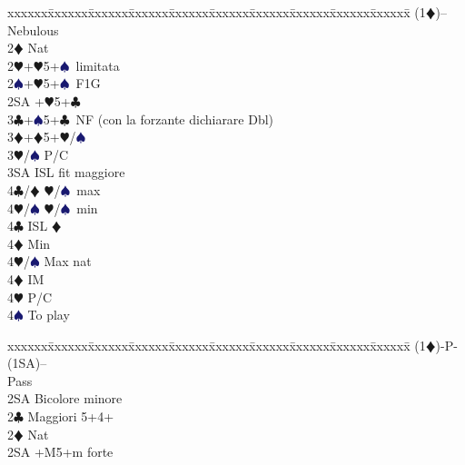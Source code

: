 \documentclass[a4paper,italian]{article}
\newcommand{\BC}{\textcolor{OliveGreen}{$\clubsuit$}}
\newcommand{\BD}{\textcolor{RedOrange}{$\vardiamondsuit$}}
\newcommand{\BH}{\textcolor{Red2}{$\varheartsuit${}}}
\newcommand{\BS}{\textcolor{MidnightBlue}{$\spadesuit${}}}
\newenvironment{bidtable}
{\begin{tabbing}

    xxxxxx\=xxxxxx\=xxxxxx\=xxxxxx\=xxxxxx\=xxxxxx\=xxxxxx\=xxxxxx\=xxxxxx\=xxxxxx\=\kill}
{\end{tabbing} }%
\begin{document}
\begin{multicols}{2}
                                        \begin{bidtable}
                                            (1\BD)-- \> Nebulous\+\\
                                            2\BD \> Nat\\
                                            2\BH {}+\BH 5+\BS\ limitata\\
                                            2\BS {}+\BH 5+\BS\ F1G\\
                                            2SA +\BH 5+\BC \\
                                            3\BC {}+\BS 5+\BC\ NF (con la forzante dichiarare Dbl)\\
                                            3\BD {}+\BD 5+\BH /\BS \+\\
                                            3\BH/\BS \> P/C\\
                                            3SA \> ISL fit maggiore\+\\
                                            4\BC/\BD \> \BH /\BS\ max\\
                                            4\BH/\BS \> \BH /\BS\ min\-\\
                                            4\BC \> ISL \BD \+\\
                                            4\BD \> Min\\
                                            4\BH/\BS \> Max nat\-\\
                                            4\BD \> IM\\
                                            4\BH \> P/C\\
                                            4\BS \> To play\-\-
                                        \end{bidtable}
                                        \begin{bidtable}
                                            (1\BD)-P-(1SA)--\+\\
                                            Pass\+\\
                                            2SA \> Bicolore minore\-\\
                                            2\BC \> Maggiori 5+4+\\
                                            2\BD \> Nat\\
                                            2SA +M5+m forte\-
                                        \end{bidtable}

\end{multicols}
\end{document}
